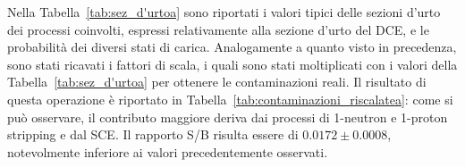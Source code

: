 Nella Tabella~\ref{tab:sez_d'urtoa} sono riportati i valori tipici delle sezioni d'urto dei processi coinvolti, espressi relativamente alla sezione d'urto del DCE, e le probabilità dei diversi stati di carica.
Analogamente a quanto visto in precedenza, sono stati ricavati i fattori di scala, i quali sono stati moltiplicati con i valori della Tabella~\ref{tab:sez_d'urtoa} per ottenere le contaminazioni reali.
Il risultato di questa operazione è riportato in Tabella~\ref{tab:contaminazioni_riscalatea}: come si può osservare, il contributo maggiore deriva dai processi di 1-neutron e 1-proton stripping e dal SCE.
Il rapporto S/B risulta essere di $0.0172 \pm 0.0008$, notevolmente inferiore ai valori precedentemente osservati.
